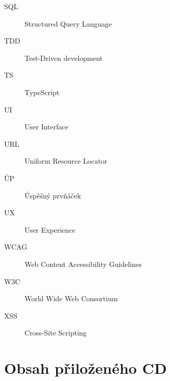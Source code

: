 \documentclass[thesis=M,czech]{FITthesis}[2019/12/23]
\begin{document}
\begin{description}
            \item[SQL] Structured Query Language
            \item[TDD] Test-Driven development
            \item[TS] TypeScript
            \item[UI] User Interface
            \item[URL] Uniform Resource Locator
            \item[ÚP] Úspěšný prvňáček
            \item[UX] User Experience
            \item[WCAG] Web Content Accessibility Guidelines
            \item[W3C] World Wide Web Consortium
            \item[XSS] Cross-Site Scripting
        \end{description}
    
    \chapter{Obsah přiloženého CD}
        \begin{figure}
        \end{figure}
\end{document}
